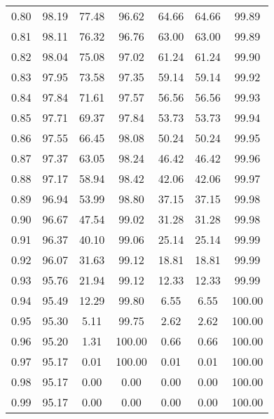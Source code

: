 \begin{tabular}{|c|c|c|c|c|c|c|}
      0.80 &     98.19 &     77.48 &      96.62 &   64.66 &      64.66 &         99.89 \\
      0.81 &     98.11 &     76.32 &      96.76 &   63.00 &      63.00 &         99.89 \\
      0.82 &     98.04 &     75.08 &      97.02 &   61.24 &      61.24 &         99.90 \\
      0.83 &     97.95 &     73.58 &      97.35 &   59.14 &      59.14 &         99.92 \\
      0.84 &     97.84 &     71.61 &      97.57 &   56.56 &      56.56 &         99.93 \\
      0.85 &     97.71 &     69.37 &      97.84 &   53.73 &      53.73 &         99.94 \\
      0.86 &     97.55 &     66.45 &      98.08 &   50.24 &      50.24 &         99.95 \\
      0.87 &     97.37 &     63.05 &      98.24 &   46.42 &      46.42 &         99.96 \\
      0.88 &     97.17 &     58.94 &      98.42 &   42.06 &      42.06 &         99.97 \\
      0.89 &     96.94 &     53.99 &      98.80 &   37.15 &      37.15 &         99.98 \\
      0.90 &     96.67 &     47.54 &      99.02 &   31.28 &      31.28 &         99.98 \\
      0.91 &     96.37 &     40.10 &      99.06 &   25.14 &      25.14 &         99.99 \\
      0.92 &     96.07 &     31.63 &      99.12 &   18.81 &      18.81 &         99.99 \\
      0.93 &     95.76 &     21.94 &      99.12 &   12.33 &      12.33 &         99.99 \\
      0.94 &     95.49 &     12.29 &      99.80 &    6.55 &       6.55 &        100.00 \\
      0.95 &     95.30 &      5.11 &      99.75 &    2.62 &       2.62 &        100.00 \\
      0.96 &     95.20 &      1.31 &     100.00 &    0.66 &       0.66 &        100.00 \\
      0.97 &     95.17 &      0.01 &     100.00 &    0.01 &       0.01 &        100.00 \\
      0.98 &     95.17 &      0.00 &       0.00 &    0.00 &       0.00 &        100.00 \\
      0.99 &     95.17 &      0.00 &       0.00 &    0.00 &       0.00 &        100.00 \\
\bottomrule
\end{tabular}
